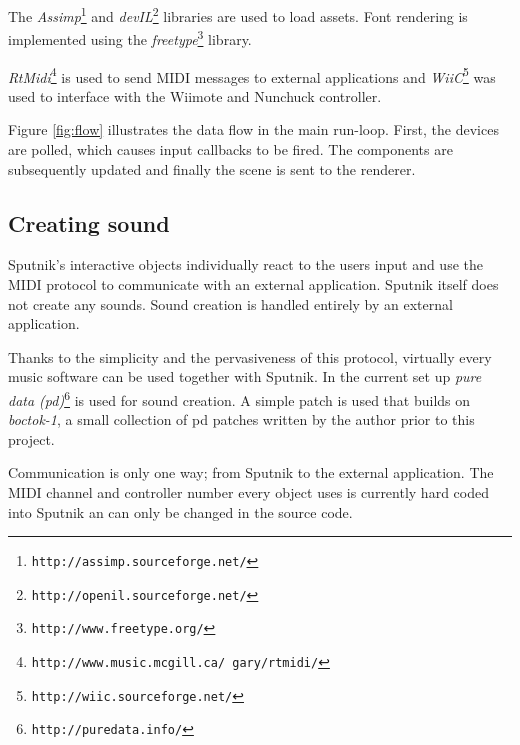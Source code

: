 \documentclass[10pt,a4paper]{scrartcl}
\begin{document}
The \emph{Assimp}\footnote{\texttt{http://assimp.sourceforge.net/}} and \emph{devIL}\footnote{\texttt{http://openil.sourceforge.net/}} libraries are used to load assets. Font rendering is implemented using the \emph{freetype}\footnote{\texttt{http://www.freetype.org/}} library.

\emph{RtMidi}\footnote{\texttt{http://www.music.mcgill.ca/~gary/rtmidi/}} is used to send MIDI messages to external applications and \emph{WiiC}\footnote{\texttt{http://wiic.sourceforge.net/}} was used to interface with the Wiimote and Nunchuck controller.

Figure \ref{fig:flow} illustrates the data flow in the main run-loop. First, the devices are polled, which causes input callbacks to be fired. The components are subsequently updated and finally the scene is sent to the renderer.

\subsection{Creating sound}
Sputnik's interactive objects individually react to the users input and use the MIDI protocol to communicate with an external application. Sputnik itself does not create any sounds. Sound creation is handled entirely by an external application.

Thanks to the simplicity and the pervasiveness of this protocol, virtually every music software can be used together with Sputnik. In the current set up \emph{pure data (pd)}\footnote{\texttt{http://puredata.info/}} is used for sound creation. A simple patch is used that builds on \emph{boctok-1}, a small collection of pd patches written by the author prior to this project. 

Communication is only one way; from Sputnik to the external application. The MIDI channel and controller number every object uses is currently hard coded into Sputnik an can only be changed in the source code. 
\end{document}
